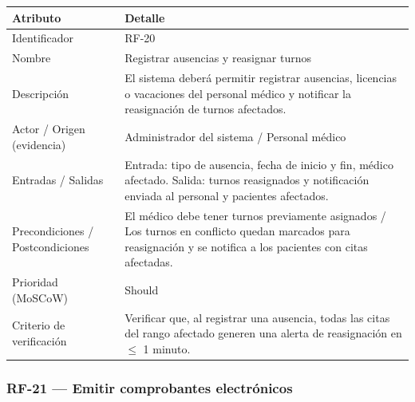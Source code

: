 \documentclass[11pt,a4paper]{article}
\begin{document}
	\begin{longtable}{p{} p{}}
		
		\toprule
		\textbf{Atributo} & \textbf{Detalle} \\
		\midrule
		\endhead
		
		Identificador & RF-20 \\
		Nombre & Registrar ausencias y reasignar turnos \\
		Descripción & El sistema deberá permitir registrar ausencias, licencias o vacaciones del personal médico y notificar la reasignación de turnos afectados. \\
		Actor / Origen (evidencia) & Administrador del sistema / Personal médico \\
		Entradas / Salidas & Entrada: tipo de ausencia, fecha de inicio y fin, médico afectado. Salida: turnos reasignados y notificación enviada al personal y pacientes afectados. \\
		Precondiciones / Postcondiciones & El médico debe tener turnos previamente asignados / Los turnos en conflicto quedan marcados para reasignación y se notifica a los pacientes con citas afectadas. \\
		Prioridad (MoSCoW) & Should \\
		Criterio de verificación & Verificar que, al registrar una ausencia, todas las citas del rango afectado generen una alerta de reasignación en \(\leq\) 1 minuto. \\
		\bottomrule
	\end{longtable}
	
	\subsubsection{RF-21 --- Emitir comprobantes electrónicos}
	
\end{document}

